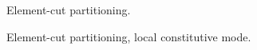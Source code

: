 \documentclass[draft]{article}
\begin{document}

\begin{figure}[htb]
\centerline{}
\caption{Element-cut partitioning.}
\label{elmentcut}
\end{figure}

\begin{figure}[htb]
\centerline{}
\caption{Element-cut partitioning, local constitutive mode.}
\label{elmentcut-lm}
\end{figure}
\end{document}
